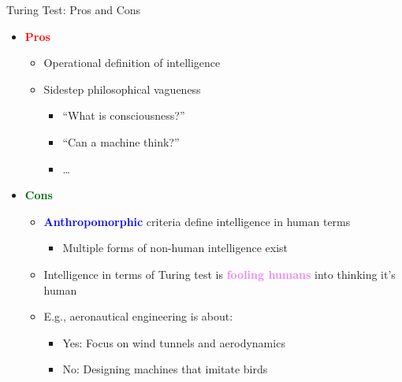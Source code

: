 \documentclass[
  10pt,
  ignorenonframetext,
]{beamer}
\providecommand{\tightlist}{%
  \setlength{\itemsep}{0pt}\setlength{\parskip}{0pt}}
\begin{document}
\begin{frame}{Turing Test: Pros and Cons}
\label{turing-test-pros-and-cons}
\begin{itemize}
\tightlist
\item
  \textbf{\textcolor{red}{Pros}}

  \begin{itemize}
  \tightlist
  \item
    Operational definition of intelligence
  \item
    Sidestep philosophical vagueness

    \begin{itemize}
    \tightlist
    \item
      ``What is consciousness?''
    \item
      ``Can a machine think?''
    \item
      \ldots{}
    \end{itemize}
  \end{itemize}
\item
  \textbf{\textcolor{darkgreen}{Cons}}

  \begin{itemize}
  \tightlist
  \item
    \textbf{\textcolor{blue}{Anthropomorphic}} criteria define
    intelligence in human terms

    \begin{itemize}
    \tightlist
    \item
      Multiple forms of non-human intelligence exist
    \end{itemize}
  \item
    Intelligence in terms of Turing test is
    \textbf{\textcolor{violet}{fooling humans}} into thinking it's human
  \item
    E.g., aeronautical engineering is about:

    \begin{itemize}
    \tightlist
    \item
      Yes: Focus on wind tunnels and aerodynamics
    \item
      No: Designing machines that imitate birds
    \end{itemize}
  \end{itemize}
\end{itemize}
\end{frame}
\end{document}
